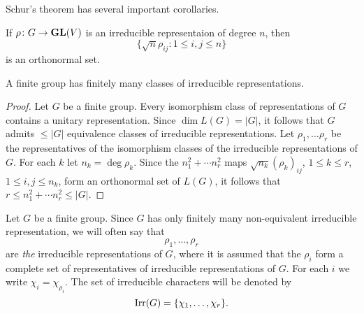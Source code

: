 Schur's theorem has several important corollaries.

If $\rho\colon G\to\mathbf{GL}(V)$ is an irreducible representaion of degree $n$, then
\[
\{\sqrt{n}\rho_{ij}:1\leq i,j\leq n\}
\]
is an orthonormal set.


\begin{corollary}
    A finite group has finitely many classes of irreducible representations. 
\end{corollary}

\begin{proof}
    Let $G$ be a finite group. 
    Every isomorphism class of representations of $G$ contains a unitary representation. Since $\dim L(G)=|G|$, 
    it follows that $G$ admits $\leq|G|$ equivalence classes of irreducible representations. Let
    $\rho_1,\dots\rho_r$ be the representatives of the isomorphism classes of the 
    irreducible representations of $G$. For each $k$ let $n_k=\deg\rho_k$. Since
    the $n_1^2+\cdots n_r^2$ maps $\sqrt{n_k}(\rho_k)_{ij}$, $1\leq k\leq r$, $1\leq i,j\leq n_k$,
    form an orthonormal set of $L(G)$, it follows that
    $r\leq n_1^2+\cdots n_r^2\leq|G|$.
\end{proof}

Let $G$ be a finite group. Since $G$ has only finitely many non-equivalent 
irreducible representation, we will often say
that 
\[
\rho_1,\dots,\rho_r
\]
are \emph{the} irreducible representations of $G$, where it is assumed that
the $\rho_i$ form a complete set of 
representatives of irreducible representations of $G$. For each $i$ we write
$\chi_i=\chi_{\rho_i}$. The set of irreducible characters will be denoted
by 
\[
\operatorname{Irr}(G)=\{\chi_1,\dots,\chi_r\}.
\]


